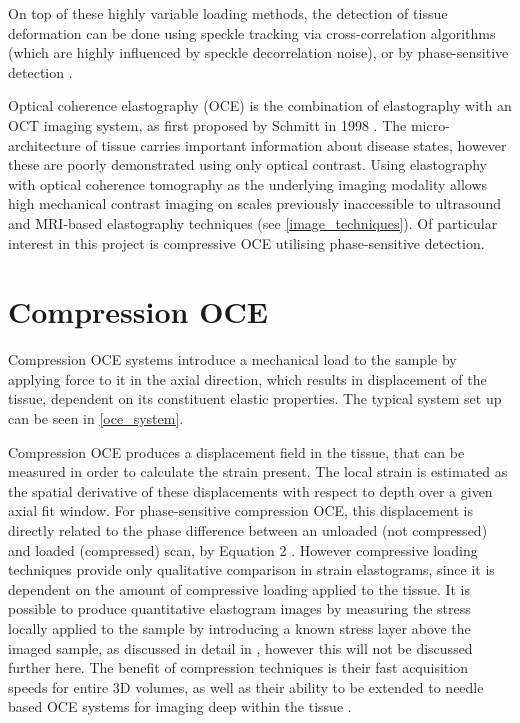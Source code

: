 On top of these highly variable loading methods, the detection of tissue deformation can be done using speckle tracking via cross-correlation algorithms (which are highly influenced by speckle decorrelation noise), or by phase-sensitive detection \cite{kennedy_strain_2012}.

Optical coherence elastography (OCE) is the combination of elastography with an OCT imaging system, as first proposed by Schmitt in 1998 \cite{schmitt_oct_1998}. The micro-architecture of tissue carries important information about disease states, however these are poorly demonstrated using only optical contrast. Using elastography with optical coherence tomography as the underlying imaging modality allows high mechanical contrast imaging on scales previously inaccessible to ultrasound and MRI-based elastography techniques (see \autoref{image_techniques}). Of particular interest in this project is compressive OCE utilising phase-sensitive detection. 

\section{Compression OCE}\label{compression_oce}    

Compression OCE systems introduce a mechanical load to the sample by applying force to it in the axial direction, which results in displacement of the tissue, dependent on its constituent elastic properties. The typical system set up can be seen in \autoref{oce_system}.

Compression OCE produces a displacement field in the tissue, that can be measured in order to calculate the strain present. The local strain is estimated as the spatial derivative of these displacements with respect to depth \cite{kennedy_review_2014} over a given axial fit window. For phase-sensitive compression OCE, this displacement is directly related to the phase difference between an unloaded (not compressed) and loaded (compressed) scan, by Equation 2 \cite{kennedy_strain_2012}. However compressive loading techniques provide only qualitative comparison in strain elastograms, since it is dependent on the amount of compressive loading applied to the tissue. It is possible to produce quantitative elastogram images by measuring the stress locally applied to the sample by introducing a known stress layer above the imaged sample, as discussed in detail in \cite{kennedy_quantitative_2015}, however this will not be discussed further here. The benefit of compression techniques is their fast acquisition speeds for entire 3D volumes, as well as their ability to be extended to needle based OCE systems for imaging deep within the tissue \cite{kennedy_review_2014}. 

